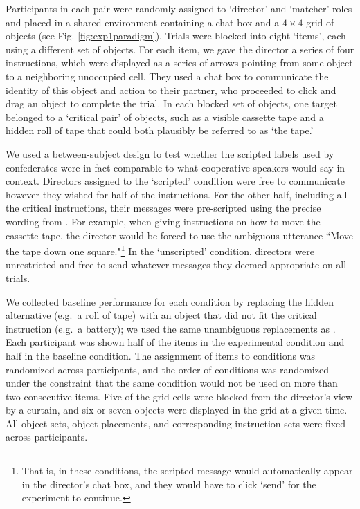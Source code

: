 \documentclass[manuscript]{stjour}
\begin{document}
Participants in each pair were randomly assigned to `director' and `matcher' roles and placed in a shared environment containing a chat box and a $4 \times 4$ grid of objects (see Fig. \ref{fig:exp1paradigm}). Trials were blocked into eight `items', each using a different set of objects. For each item, we gave the director a series of four instructions, which were displayed as a series of arrows pointing from some object to a neighboring unoccupied cell. They used a chat box to communicate the identity of this object and action to their partner, who proceeded to click and drag an object to complete the trial. In each blocked set of objects, one target belonged to a `critical pair' of objects, such as a visible cassette tape and a hidden roll of tape that could both plausibly be referred to as `the tape.'

We used a between-subject design to test whether the scripted labels used by confederates were in fact comparable to what cooperative speakers would say in context. Directors assigned to the `scripted' condition were free to communicate however they wished for half of the instructions. For the other half, including all the critical instructions, their messages were pre-scripted using the precise wording from \cite{KeysarLinBarr03_LimitsOnTheoryOfMindUse}. For example, when giving instructions on how to move the cassette tape, the director would be forced to use the ambiguous utterance ``Move the tape down one square."\footnote{That is, in these conditions, the scripted message would automatically appear in the director's chat box, and they would have to click `send' for the experiment to continue.} In the `unscripted' condition, directors were unrestricted and free to send whatever messages they deemed appropriate on all trials. 

We collected baseline performance for each condition by replacing the hidden alternative (e.g.~a roll of tape) with an object that did not fit the critical instruction (e.g.~a battery); we used the same unambiguous replacements as \cite{KeysarLinBarr03_LimitsOnTheoryOfMindUse}. Each participant was shown half of the items in the experimental condition and half in the baseline condition. The assignment of items to conditions was randomized across participants, and the order of conditions was randomized under the constraint that the same condition would not be used on more than two consecutive items. Five of the grid cells were blocked from the director's view by a curtain, and six or seven objects were displayed in the grid at a given time. All object sets, object placements, and corresponding instruction sets were fixed across participants. 
\end{document}
